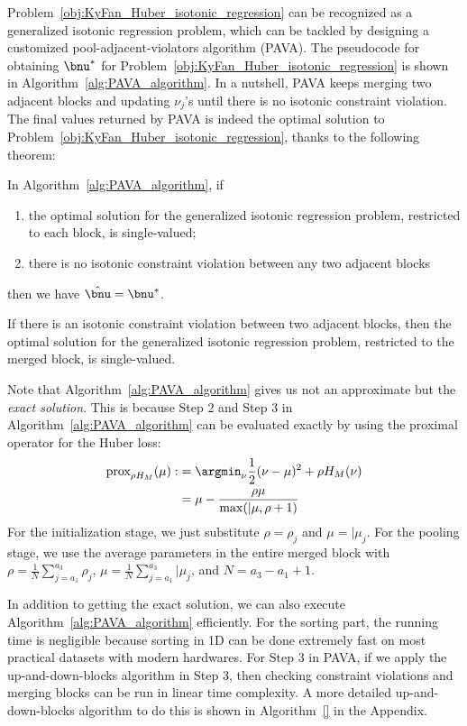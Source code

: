 Problem~\eqref{obj:KyFan_Huber_isotonic_regression} can be recognized as a generalized isotonic regression problem, which can be tackled by designing a customized pool-adjacent-violators algorithm (PAVA).
The pseudocode for obtaining $\bnu^*$ for Problem~\eqref{obj:KyFan_Huber_isotonic_regression} is shown in Algorithm~\ref{alg:PAVA_algorithm}.
In a nutshell, PAVA keeps merging two adjacent blocks and updating $\nu_j$'s until there is no isotonic constraint violation.
The final values returned by PAVA is indeed the optimal solution to Problem~\eqref{obj:KyFan_Huber_isotonic_regression}, thanks to the following theorem:
\begin{namedtheorem}[~\ref{theorem:PAVA_gives_optimal_solution}]
    \label{appendix_theorem:PAVA_gives_optimal_solution}
    \cite{best2000minimizing}
    In Algorithm~\ref{alg:PAVA_algorithm}, if
    \begin{enumerate}
        \item the optimal solution for the generalized isotonic regression problem, restricted to each block, is single-valued;
        \item there is no isotonic constraint violation between any two adjacent blocks
    \end{enumerate}
    then we have $\hat{\bnu} = \bnu^*$.
    
    If there is an isotonic constraint violation between two adjacent blocks, then the optimal solution for the generalized isotonic regression problem, restricted to the merged block, is single-valued.
    
\end{namedtheorem}
Note that Algorithm~\ref{alg:PAVA_algorithm} gives us not an approximate but the \textit{exact solution}.
This is because Step 2 and Step 3 in Algorithm~\ref{alg:PAVA_algorithm} can be evaluated exactly by using the proximal operator for the Huber loss:
\begin{align}
    \text{prox}_{\rho H_M} (\mu) :&= \argmin_{\nu} \frac{1}{2} (\nu - \mu)^2 + \rho H_M(\nu) \nonumber \\
    &= \mu - \frac{\rho \mu}{\max(\vert{\mu}, \rho + 1)}
\end{align}
For the initialization stage, we just substitute $\rho=\rho_j$ and $\mu=\vert{\mu_j}$.
For the pooling stage, we use the average parameters in the entire merged block with $\rho = \frac{1}{N} \sum_{j=a_1}^{a_3} \rho_j$, $\mu = \frac{1}{N} \sum_{j=a_1}^{a_3} \vert{\mu_j}$, and $N = a_3 - a_1 + 1$.

In addition to getting the exact solution, we can also execute Algorithm~\ref{alg:PAVA_algorithm} efficiently.
For the sorting part, the running time is negligible because sorting in 1D can be done extremely fast on most practical datasets with modern hardwares.
For Step 3 in PAVA, if we apply the up-and-down-blocks algorithm in Step 3, then checking constraint violations and merging blocks can be run in linear time complexity.
A more detailed up-and-down-blocks algorithm to do this is shown in Algorithm~\ref{} in the Appendix.

